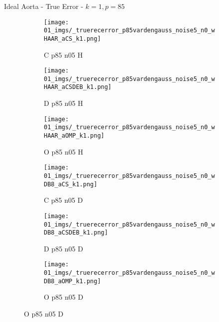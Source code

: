 \begin{frame}{Ideal Aorta - True Error - $k=1,p=85$}{}
\begin{figure}
\begin{subfigure}{0.13\textwidth}
\texttt{[image: 01\_imgs/\_truerecerror\_p85vardengauss\_noise5\_n0\_wHAAR\_aCS\_k1.png]}
\caption*{\tiny C p85 n05 H}
\end{subfigure}
\begin{subfigure}{0.13\textwidth}
\texttt{[image: 01\_imgs/\_truerecerror\_p85vardengauss\_noise5\_n0\_wHAAR\_aCSDEB\_k1.png]}
\caption*{\tiny D p85 n05 H}
\end{subfigure}
\begin{subfigure}{0.13\textwidth}
\texttt{[image: 01\_imgs/\_truerecerror\_p85vardengauss\_noise5\_n0\_wHAAR\_aOMP\_k1.png]}
\caption*{\tiny O p85 n05 H}
\end{subfigure}
\begin{subfigure}{0.13\textwidth}
\texttt{[image: 01\_imgs/\_truerecerror\_p85vardengauss\_noise5\_n0\_wDB8\_aCS\_k1.png]}
\caption*{\tiny C p85 n05 D}
\end{subfigure}
\begin{subfigure}{0.13\textwidth}
\texttt{[image: 01\_imgs/\_truerecerror\_p85vardengauss\_noise5\_n0\_wDB8\_aCSDEB\_k1.png]}
\caption*{\tiny D p85 n05 D}
\end{subfigure}
\begin{subfigure}{0.13\textwidth}
\texttt{[image: 01\_imgs/\_truerecerror\_p85vardengauss\_noise5\_n0\_wDB8\_aOMP\_k1.png]}
\caption*{\tiny O p85 n05 D}
\end{subfigure}

\vspace{5pt}


\end{figure}
\end{frame}
